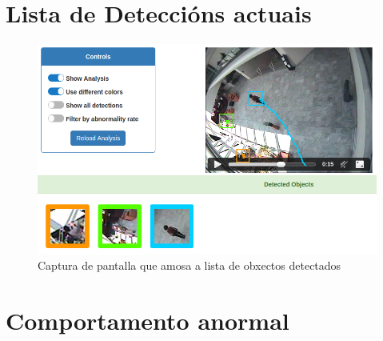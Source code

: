     
\section{Lista de Deteccións actuais}

    \begin{figure}[htp]
    \begin{center}
        \includegraphics[scale=0.4]{figures/detectedObjects.png}
        \caption{Captura de pantalla que amosa a lista de obxectos detectados}
    \label{fig:detectedObjects}
    \end{center}
    \end{figure}
    
\section{Comportamento anormal}
